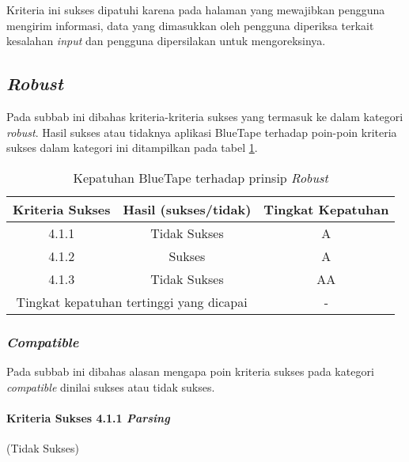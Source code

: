 Kriteria ini sukses dipatuhi karena pada halaman yang mewajibkan pengguna mengirim informasi, data yang dimasukkan oleh pengguna diperiksa terkait kesalahan \textit{input} dan pengguna dipersilakan untuk mengoreksinya.

\subsection{\textit{Robust}}
\label{subsec:kepatuhan_bluetape_robust}
Pada subbab ini dibahas kriteria-kriteria sukses yang termasuk ke dalam kategori \textit{robust}. Hasil sukses atau tidaknya aplikasi BlueTape terhadap poin-poin kriteria sukses dalam kategori ini ditampilkan pada tabel \ref{tab:kepatuhan_bluetape_robust}.

\begin{table}[H]
    \centering 
    \caption{Kepatuhan BlueTape terhadap prinsip \textit{Robust}}
    \label{tab:kepatuhan_bluetape_robust}
    \begin{tabular}{|c|c|c|}
        \toprule
        Kriteria Sukses & Hasil (sukses/tidak) & Tingkat Kepatuhan\\

        \midrule
        \rowcolor{darkred} 4.1.1 & Tidak Sukses & A \\
        4.1.2 & Sukses & A \\
        \rowcolor{brightred} 4.1.3 & Tidak Sukses & AA \\

        \bottomrule
        \multicolumn{2}{|c|}{Tingkat kepatuhan tertinggi yang dicapai} & - \\
        \bottomrule

    \end{tabular} 
\end{table}

\subsubsection{\textit{Compatible}}
\label{subsubsec:kepatuhan_bluetape_compatible}
Pada subbab ini dibahas alasan mengapa poin kriteria sukses pada kategori \textit{compatible} dinilai sukses atau tidak sukses.

\paragraph{Kriteria Sukses 4.1.1 \textit{Parsing}}
\label{par:kepatuhan_bluetape_kriteria_sukses_4.1.1}
(Tidak Sukses)\\

